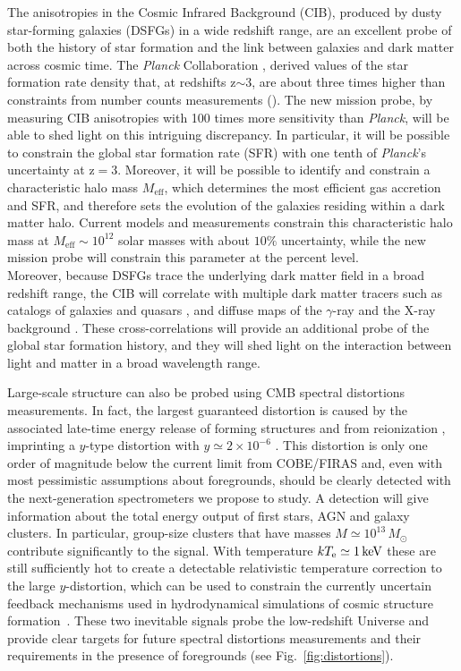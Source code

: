 The anisotropies in the Cosmic Infrared Background (CIB), produced by
dusty star-forming galaxies (DSFGs) in a wide redshift range, are
an excellent probe of both the history of star formation and the link between
galaxies and dark matter across cosmic time. The {\it Planck} Collaboration \citep{planck2014-XXX,planckXVIII},
derived values of the star formation rate density that,
at redshifts z$\mathrm{\sim3}$, are about three times higher
than constraints from number counts measurements (\cite{madau2014}).
The new mission probe, by measuring CIB anisotropies with 100 times more
sensitivity than {\it Planck}, will be able to shed light on this intriguing
discrepancy. In particular, it will be possible to constrain the global star formation rate (SFR)
with one tenth of {\it Planck}'s uncertainty
at z$\mathrm{=3}$. Moreover, it will be possible to identify and constrain a
characteristic halo mass $M_{\mathrm{eff}}$,
which determines the most efficient gas accretion and SFR, and
therefore sets the evolution of the galaxies residing within
a dark matter halo. Current models and measurements
constrain this characteristic halo mass at
$M_{\mathrm{eff}}\sim 10^{12}$ solar masses with about $\mathrm{10\%}$
uncertainty, while the new mission probe will
constrain this parameter at the percent level.\\
Moreover, because DSFGs trace the underlying dark matter
field in a broad redshift range, the CIB will
correlate with multiple dark matter
tracers such as catalogs of galaxies and quasars
\citep{serra2014,wang2015},
and diffuse maps of the $\gamma$-ray and
the X-ray background \citep{cooray2016}.
These cross-correlations will provide an additional probe of the
global star formation history, and they
will shed light on the interaction between light and matter
in a broad wavelength range.

Large-scale structure can also be probed using CMB spectral distortions measurements. In fact, the largest guaranteed distortion is caused by the associated late-time energy release of forming structures and from reionization \citep{Sunyaev1972b, Hu1994pert, Oh2003, Cen1999, Refregier2000}, imprinting a $y$-type distortion 
with $y \simeq 2\times 10^{-6}$ \citep[e.g.,][]{Refregier2000, Hill2015}. This distortion is only one order of magnitude below the current limit from COBE/FIRAS and, even with most pessimistic assumptions about foregrounds, should be clearly detected with the next-generation spectrometers we propose to study. A detection will give information about the total energy output of first stars, AGN and galaxy clusters. In particular, group-size clusters that have masses $M\simeq 10^{13}\,M_{\odot}$ contribute significantly to the signal. With temperature $k T_{\rm e}\simeq 1\,{\rm keV}$ these are still sufficiently hot to create a detectable relativistic temperature correction to the large $y$-distortion, 
which can be used to constrain the currently uncertain feedback mechanisms used in hydrodynamical simulations
of cosmic structure formation~\citep{Hill2015}. These two inevitable signals probe the low-redshift 
Universe and provide clear targets for future spectral distortions measurements and their requirements in the presence of foregrounds (see Fig.~\ref{fig:distortions}).

